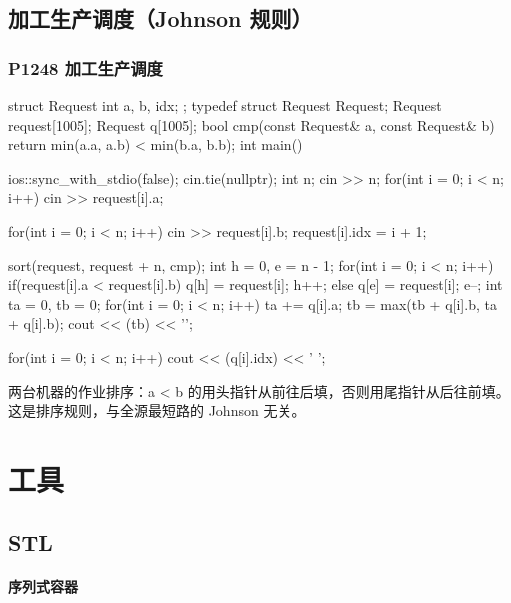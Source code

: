 \section{加工生产调度（Johnson 规则）}
\subsection{P1248 加工生产调度}\label{p1248-ux52a0ux5de5ux751fux4ea7ux8c03ux5ea6}






\begin{codeline}
struct Request {
    int a, b, idx;
};
typedef struct Request Request;
Request request[1005];
Request q[1005];
bool cmp(const Request& a, const Request& b) {
    return min(a.a, a.b) < min(b.a, b.b);
}
int main() {
    ios::sync_with_stdio(false);
    cin.tie(nullptr);
    int n;
    cin >> n;
    for(int i = 0; i < n; i++) {
        cin >> request[i].a;
    }

    for(int i = 0; i < n; i++) {
        cin >> request[i].b;
        request[i].idx = i + 1;
    }

    sort(request, request + n, cmp);
    int h = 0, e = n - 1;
    for(int i = 0; i < n; i++) {
        if(request[i].a < request[i].b) {
            q[h] = request[i];
            h++;
        } else {
            q[e] = request[i];
            e--;
        }
    }
    int ta = 0, tb = 0;
    for(int i = 0; i < n; i++) {
        ta += q[i].a;
        tb = max(tb + q[i].b, ta + q[i].b);
    }
    cout << (tb) << '\n';

    for(int i = 0; i < n; i++) {
        cout << (q[i].idx) << ' ';
    }
}
\end{codeline}
\begin{warnbox}
两台机器的作业排序：a < b 的用头指针从前往后填，否则用尾指针从后往前填。这是排序规则，与全源最短路的 Johnson 无关。
\end{warnbox}


\chapter{工具}

\section{STL}
\subsubsection{序列式容器}\label{ux5e8fux5217ux5f0fux5bb9ux5668}

